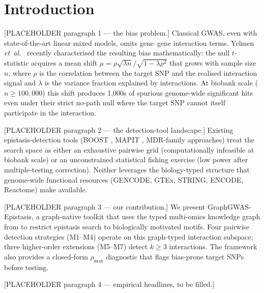 
\section{Introduction}\label{sec:intro}

[PLACEHOLDER paragraph 1 --- the bias problem.] Classical GWAS, even
with state-of-the-art linear mixed models, omits gene--gene interaction
terms. Yelmen \emph{et~al.}\ \cite{yelmen2026} recently characterised
the resulting bias mathematically: the null $t$-statistic acquires a
mean shift $\mu = \rho\sqrt{\lambda n}/\sqrt{1-\lambda\rho^{2}}$ that
grows with sample size $n$, where $\rho$ is the correlation between
the target SNP and the realised interaction signal and $\lambda$ is
the variance fraction explained by interactions. At biobank scale
($n\geq 100{,}000$) this shift produces 1{,}000s of spurious
genome-wide significant hits even under their strict no-path null
where the target SNP cannot itself participate in the interaction.

[PLACEHOLDER paragraph 2 --- the detection-tool landscape.] Existing
epistasis-detection tools (BOOST \cite{wan2010boost},
MAPIT \cite{crawford2017}, MDR-family approaches) treat the search space
as either an exhaustive pairwise grid (computationally infeasible at
biobank scale) or an unconstrained statistical fishing exercise (low
power after multiple-testing correction). Neither leverages the
biology-typed structure that genome-wide functional resources
(GENCODE, GTEx, STRING, ENCODE, Reactome) make available.

[PLACEHOLDER paragraph 3 --- our contribution.] We present
GraphGWAS-Epistasis, a graph-native toolkit that uses the typed
multi-omics knowledge graph from \cite{estaji2026graphgwas} to
restrict epistasis search to biologically motivated motifs. Four
pairwise detection strategies (M1--M4) operate on this graph-typed
interaction subspace; three higher-order extensions (M5--M7) detect
$k\geq 3$ interactions. The framework also provides a closed-form
$\rho_{\max}$ diagnostic that flags bias-prone target SNPs before
testing.

[PLACEHOLDER paragraph 4 --- empirical headlines, to be filled.]

